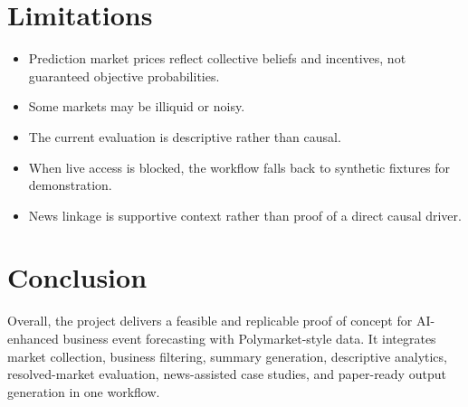 \documentclass[12pt]{article}
\begin{document}
\section{Limitations}

\begin{itemize}
\item Prediction market prices reflect collective beliefs and incentives, not guaranteed objective probabilities.
\item Some markets may be illiquid or noisy.
\item The current evaluation is descriptive rather than causal.
\item When live access is blocked, the workflow falls back to synthetic fixtures for demonstration.
\item News linkage is supportive context rather than proof of a direct causal driver.
\end{itemize}

\section{Conclusion}

Overall, the project delivers a feasible and replicable proof of concept for AI-enhanced business event forecasting with Polymarket-style data. It integrates market collection, business filtering, summary generation, descriptive analytics, resolved-market evaluation, news-assisted case studies, and paper-ready output generation in one workflow.
\end{document}
